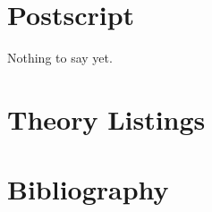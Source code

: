 
\section{Postscript}\label{POSTSCRIPT}

 Nothing to say yet.

\pagebreak
\appendix

\section{Theory Listings}

\vfill

{
\let\Section\subsection
\let\Subsection\subsubsection
\def\subsection#1{\Subsection*{#1}}

\def\section#1{\Section{#1}\label{icomb}}

}  %


\pagebreak

\section*{Bibliography}\label{BIBLIOGRAPHY}

{\def\section*#1{\ignore{#1}}
\raggedright


} %

{
{\small\printindex}}


